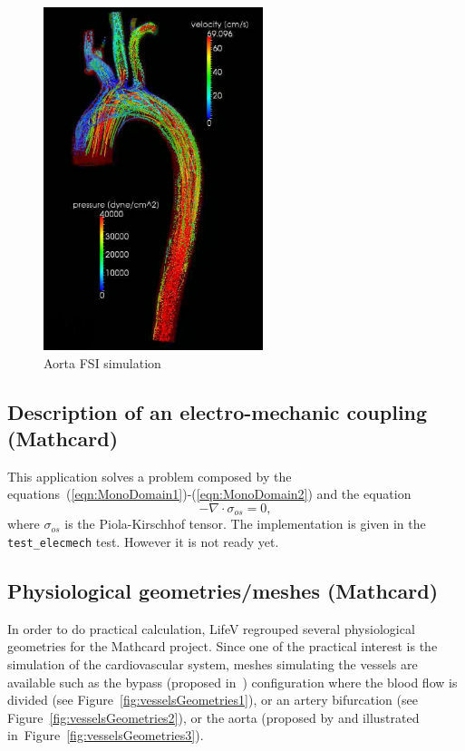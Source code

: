 \documentclass[11pt]{article}
\begin{document}
\begin{figure}[H]
\centering
\includegraphics[height=10cm]{images/geometriesAndMeshes/crosettoAorta.png}
\caption{Aorta FSI simulation}
\label{fig:aortaFSISimulation}
\end{figure}

\subsection{Description of an electro-mechanic coupling (Mathcard)}
This application solves a problem composed by the equations~(\ref{eqn:MonoDomain1})-(\ref{eqn:MonoDomain2}) and the equation
\begin{equation}
-\nabla\cdot\sigma_{os}=0,
\end{equation}
where $\sigma_{os}$ is the Piola-Kirschhof tensor.
The implementation is given in the \texttt{test\_elecmech} test. However it is not ready yet.

\subsection{Physiological geometries/meshes (Mathcard)}
In order to do practical calculation, LifeV regrouped several physiological geometries for the Mathcard project. Since one of the practical interest is the simulation of the cardiovascular system, meshes simulating the vessels are available such as the bypass (proposed in~\cite{ku}) configuration where the blood flow is divided (see Figure~\ref{fig:vesselsGeometries1}), or an artery bifurcation (see Figure~\ref{fig:vesselsGeometries2}), or the aorta (proposed by \cite{simbios} and illustrated in~Figure~\ref{fig:vesselsGeometries3}).
\end{document}

